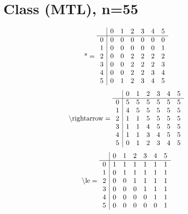 \documentclass[11pt]{article}
\begin{document}
\section{Class (MTL), n=55}
\[\text{*} = 
\begin{array}{r | r r r r r r}
 & 0 & 1 & 2 & 3 & 4 & 5 \\ \hline
0 & 0 & 0 & 0 & 0 & 0 & 0 \\
1 & 0 & 0 & 0 & 0 & 0 & 1 \\
2 & 0 & 0 & 2 & 2 & 2 & 2 \\
3 & 0 & 0 & 2 & 2 & 2 & 3 \\
4 & 0 & 0 & 2 & 2 & 3 & 4 \\
5 & 0 & 1 & 2 & 3 & 4 & 5 \\
\end{array}
\]
\[\text{\textbackslash rightarrow} = 
\begin{array}{r | r r r r r r}
 & 0 & 1 & 2 & 3 & 4 & 5 \\ \hline
0 & 5 & 5 & 5 & 5 & 5 & 5 \\
1 & 4 & 5 & 5 & 5 & 5 & 5 \\
2 & 1 & 1 & 5 & 5 & 5 & 5 \\
3 & 1 & 1 & 4 & 5 & 5 & 5 \\
4 & 1 & 1 & 3 & 4 & 5 & 5 \\
5 & 0 & 1 & 2 & 3 & 4 & 5 \\
\end{array}
\]
\[\text{\textbackslash le} = 
\begin{array}{r | r r r r r r}
 & 0 & 1 & 2 & 3 & 4 & 5 \\ \hline
0 & 1 & 1 & 1 & 1 & 1 & 1 \\
1 & 0 & 1 & 1 & 1 & 1 & 1 \\
2 & 0 & 0 & 1 & 1 & 1 & 1 \\
3 & 0 & 0 & 0 & 1 & 1 & 1 \\
4 & 0 & 0 & 0 & 0 & 1 & 1 \\
5 & 0 & 0 & 0 & 0 & 0 & 1 \\
\end{array}
\]
\end{document}
